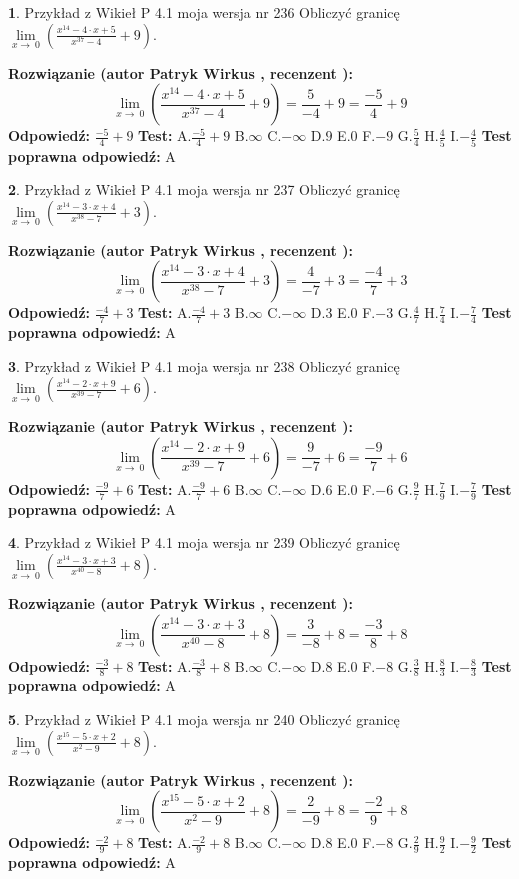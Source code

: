 \documentclass[12pt, a4paper]{article}
\theoremstyle{definition} %
\newtheorem{zad}{}
\newcommand{\zadStart}[1]{\begin{zad}#1\newline}
\newcommand{\zadStop}{\end{zad}}
\newcommand{\rozwStart}[2]{\noindent \textbf{Rozwiązanie (autor #1 , recenzent #2): }\newline}
\newcommand{\rozwStop}{\newline}
\newcommand{\odpStart}{\noindent \textbf{Odpowiedź:}\newline}
\newcommand{\odpStop}{\newline}
\newcommand{\testStart}{\noindent \textbf{Test:}\newline}
\newcommand{\testStop}{\newline}
\newcommand{\kluczStart}{\noindent \textbf{Test poprawna odpowiedź:}\newline}
\newcommand{\kluczStop}{\newline}
\begin{document}
\zadStart{Przykład z Wikieł P 4.1 moja wersja nr 236}
Obliczyć granicę $\lim\limits_{x\to\ 0}(\frac{x^{14}-4 \cdot x +5}{x^{37}-4}+9)$.
\zadStop
\rozwStart{Patryk Wirkus}{}
$$\lim\limits_{x\to\ 0}(\frac{x^{14}-4 \cdot x +5}{x^{37}-4}+9)=\frac{5}{-4}+9=\frac{-5}{4}+9$$
\rozwStop
\odpStart
$\frac{-5}{4}+9$
\odpStop
\testStart
A.$\frac{-5}{4}+9$
B.$\infty$
C.$-\infty$
D.$9$
E.$0$
F.$-9$
G.$\frac{5}{4}$
H.$\frac{4}{5}$
I.$-\frac{4}{5}$
\testStop
\kluczStart
A
\kluczStop



\zadStart{Przykład z Wikieł P 4.1 moja wersja nr 237}
Obliczyć granicę $\lim\limits_{x\to\ 0}(\frac{x^{14}-3 \cdot x +4}{x^{38}-7}+3)$.
\zadStop
\rozwStart{Patryk Wirkus}{}
$$\lim\limits_{x\to\ 0}(\frac{x^{14}-3 \cdot x +4}{x^{38}-7}+3)=\frac{4}{-7}+3=\frac{-4}{7}+3$$
\rozwStop
\odpStart
$\frac{-4}{7}+3$
\odpStop
\testStart
A.$\frac{-4}{7}+3$
B.$\infty$
C.$-\infty$
D.$3$
E.$0$
F.$-3$
G.$\frac{4}{7}$
H.$\frac{7}{4}$
I.$-\frac{7}{4}$
\testStop
\kluczStart
A
\kluczStop



\zadStart{Przykład z Wikieł P 4.1 moja wersja nr 238}
Obliczyć granicę $\lim\limits_{x\to\ 0}(\frac{x^{14}-2 \cdot x +9}{x^{39}-7}+6)$.
\zadStop
\rozwStart{Patryk Wirkus}{}
$$\lim\limits_{x\to\ 0}(\frac{x^{14}-2 \cdot x +9}{x^{39}-7}+6)=\frac{9}{-7}+6=\frac{-9}{7}+6$$
\rozwStop
\odpStart
$\frac{-9}{7}+6$
\odpStop
\testStart
A.$\frac{-9}{7}+6$
B.$\infty$
C.$-\infty$
D.$6$
E.$0$
F.$-6$
G.$\frac{9}{7}$
H.$\frac{7}{9}$
I.$-\frac{7}{9}$
\testStop
\kluczStart
A
\kluczStop



\zadStart{Przykład z Wikieł P 4.1 moja wersja nr 239}
Obliczyć granicę $\lim\limits_{x\to\ 0}(\frac{x^{14}-3 \cdot x +3}{x^{40}-8}+8)$.
\zadStop
\rozwStart{Patryk Wirkus}{}
$$\lim\limits_{x\to\ 0}(\frac{x^{14}-3 \cdot x +3}{x^{40}-8}+8)=\frac{3}{-8}+8=\frac{-3}{8}+8$$
\rozwStop
\odpStart
$\frac{-3}{8}+8$
\odpStop
\testStart
A.$\frac{-3}{8}+8$
B.$\infty$
C.$-\infty$
D.$8$
E.$0$
F.$-8$
G.$\frac{3}{8}$
H.$\frac{8}{3}$
I.$-\frac{8}{3}$
\testStop
\kluczStart
A
\kluczStop



\zadStart{Przykład z Wikieł P 4.1 moja wersja nr 240}
Obliczyć granicę $\lim\limits_{x\to\ 0}(\frac{x^{15}-5 \cdot x +2}{x^{2}-9}+8)$.
\zadStop
\rozwStart{Patryk Wirkus}{}
$$\lim\limits_{x\to\ 0}(\frac{x^{15}-5 \cdot x +2}{x^{2}-9}+8)=\frac{2}{-9}+8=\frac{-2}{9}+8$$
\rozwStop
\odpStart
$\frac{-2}{9}+8$
\odpStop
\testStart
A.$\frac{-2}{9}+8$
B.$\infty$
C.$-\infty$
D.$8$
E.$0$
F.$-8$
G.$\frac{2}{9}$
H.$\frac{9}{2}$
I.$-\frac{9}{2}$
\testStop
\kluczStart
A
\kluczStop
\end{document}
